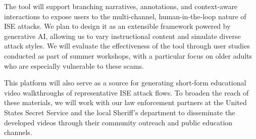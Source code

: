 The tool will support branching narratives, annotations, and context-aware interactions to expose users to the multi-channel, human-in-the-loop nature of ISE attacks. We plan to design it as an extensible framework powered by generative AI, allowing us to vary instructional content and simulate diverse attack styles. We will evaluate the effectiveness of the tool through user studies conducted as part of summer workshops, with a particular focus on older adults who are especially vulnerable to these scams.

This platform will also serve as a source for generating short-form educational video walkthroughs of representative ISE attack flows. To broaden the reach of these materials, we will work with our law enforcement partners at the United States Secret Service and the local Sheriff's department to disseminate the developed videos through their community outreach and public education channels.





